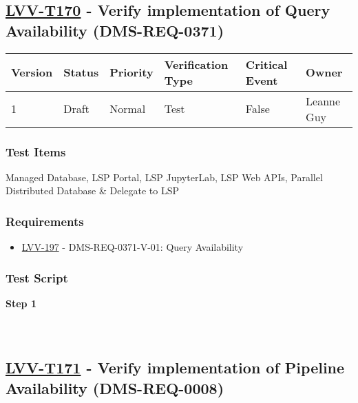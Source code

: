 \hypertarget{lvv-t170---verify-implementation-of-query-availability-dms-req-0371}{%
\subsection{\texorpdfstring{\href{https://jira.lsstcorp.org/secure/Tests.jspa\#/testCase/LVV-T170}{LVV-T170}
- Verify implementation of Query Availability
(DMS-REQ-0371)}{LVV-T170 - Verify implementation of Query Availability (DMS-REQ-0371)}}\label{lvv-t170---verify-implementation-of-query-availability-dms-req-0371}}

\begin{longtable}[]{@{}llllll@{}}
\toprule
Version & Status & Priority & Verification Type & Critical Event &
Owner\tabularnewline
\midrule
\endhead
1 & Draft & Normal & Test & False & Leanne Guy\tabularnewline
\bottomrule
\end{longtable}

\hypertarget{test-items-146}{%
\subsubsection{Test Items}\label{test-items-146}}

Managed Database, LSP Portal, LSP JupyterLab, LSP Web APIs, Parallel
Distributed Database \& Delegate to LSP

\hypertarget{requirements-147}{%
\subsubsection{Requirements}\label{requirements-147}}

\begin{itemize}
\tightlist
\item
  \href{https://jira.lsstcorp.org/browse/LVV-197}{LVV-197} -
  DMS-REQ-0371-V-01: Query Availability
\end{itemize}

\hypertarget{test-script-147}{%
\subsubsection{Test Script}\label{test-script-147}}

\textbf{Step 1}\\
~\\
~\\

\hypertarget{lvv-t171---verify-implementation-of-pipeline-availability-dms-req-0008}{%
\subsection{\texorpdfstring{\href{https://jira.lsstcorp.org/secure/Tests.jspa\#/testCase/LVV-T171}{LVV-T171}
- Verify implementation of Pipeline Availability
(DMS-REQ-0008)}{LVV-T171 - Verify implementation of Pipeline Availability (DMS-REQ-0008)}}\label{lvv-t171---verify-implementation-of-pipeline-availability-dms-req-0008}}


